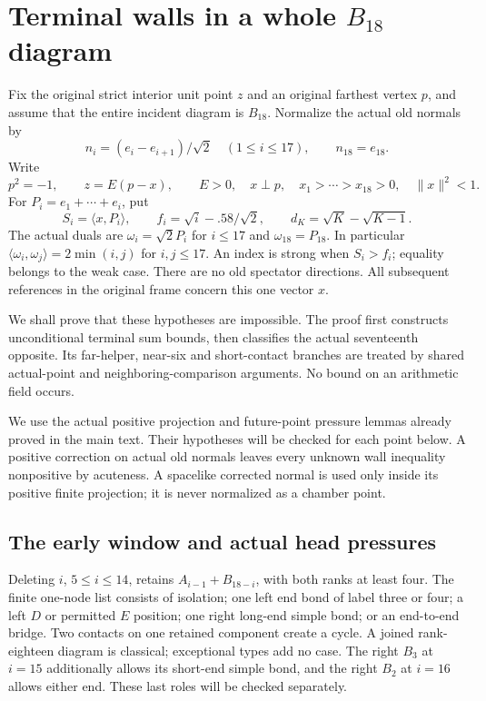 \documentclass[11pt]{article}
\theoremstyle{definition}
\theoremstyle{remark}
\newcommand{\ip}[2]{\langle #1,#2\rangle}
\newcommand{\norm}[1]{\lVert #1\rVert}
\begin{document}
\section[Terminal walls in a whole B18 diagram]{Terminal walls in a whole \(B_{18}\) diagram}
\label{app:wholeB18}
Fix the original strict interior unit point \(z\) and an original
farthest vertex \(p\), and assume that the entire incident diagram
is \(B_{18}\). Normalize the actual old normals by
\[
 n_i=(e_i-e_{i+1})/\sqrt2\quad(1\leq i\leq17),\qquad n_{18}=e_{18}.
\]
Write
\[
 p^2=-1,\qquad z=E(p-x),\qquad E>0,\quad x\perp p,\quad
 x_1>\cdots>x_{18}>0,\quad \norm x^2<1.
\]
For \(P_i=e_1+\cdots+e_i\), put
\[
 S_i=\ip x{P_i},\qquad f_i=\sqrt i-.58/\sqrt2,\qquad
 d_K=\sqrt K-\sqrt{K-1}.
\]
The actual duals are \(\omega_i=\sqrt2P_i\) for \(i\leq17\)
and \(\omega_{18}=P_{18}\). In particular
\(\ip{\omega_i}{\omega_j}=2\min(i,j)\) for \(i,j\leq17\).
An index is strong when \(S_i>f_i\); equality belongs to the weak case.
There are no old spectator directions. All subsequent references
in the original frame concern this one vector \(x\).

We shall prove that these hypotheses are impossible. The proof first
constructs unconditional terminal sum bounds, then classifies the actual
seventeenth opposite. Its far-helper, near-six and short-contact branches
are treated by shared actual-point and neighboring-comparison arguments.
No bound on an arithmetic field occurs.

We use the actual positive projection and future-point pressure lemmas
already proved in the main text. Their hypotheses will be checked for
each point below. A positive correction on actual old normals leaves
every unknown wall inequality nonpositive by acuteness. A spacelike
corrected normal is used only inside its positive finite projection;
it is never normalized as a chamber point.

\subsection{The early window and actual head pressures}
\label{app:B18bulk}
Deleting \(i\), \(5\leq i\leq14\), retains
\(A_{i-1}+B_{18-i}\), with both ranks at least four.
The finite one-node list consists of isolation; one left end bond
of label three or four; a left \(D\) or permitted \(E\) position;
one right long-end simple bond; or an end-to-end bridge.
Two contacts on one retained component create a cycle. A joined
rank-eighteen diagram is classical; exceptional types add no case.
The right \(B_3\) at \(i=15\) additionally allows its short-end
simple bond, and the right \(B_2\) at \(i=16\) allows either end.
These last roles will be checked separately.
\end{document}
